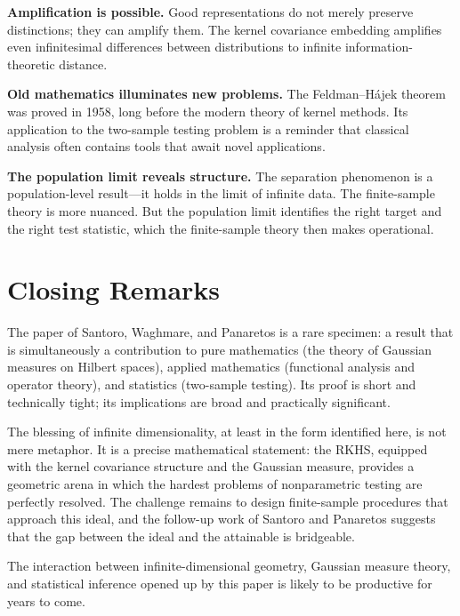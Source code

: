 \documentclass[12pt, oneside]{book}
\theoremstyle{plain}
\theoremstyle{definition}
\begin{document}
\textbf{Amplification is possible.} Good representations do not merely preserve distinctions; they can amplify them. The kernel covariance embedding amplifies even infinitesimal differences between distributions to infinite information-theoretic distance.

\textbf{Old mathematics illuminates new problems.} The Feldman--H\'ajek theorem was proved in 1958, long before the modern theory of kernel methods. Its application to the two-sample testing problem is a reminder that classical analysis often contains tools that await novel applications.

\textbf{The population limit reveals structure.} The separation phenomenon is a population-level result---it holds in the limit of infinite data. The finite-sample theory is more nuanced. But the population limit identifies the right target and the right test statistic, which the finite-sample theory then makes operational.

\section{Closing Remarks}

The paper of Santoro, Waghmare, and Panaretos is a rare specimen: a result that is simultaneously a contribution to pure mathematics (the theory of Gaussian measures on Hilbert spaces), applied mathematics (functional analysis and operator theory), and statistics (two-sample testing). Its proof is short and technically tight; its implications are broad and practically significant.

The blessing of infinite dimensionality, at least in the form identified here, is not mere metaphor. It is a precise mathematical statement: the RKHS, equipped with the kernel covariance structure and the Gaussian measure, provides a geometric arena in which the hardest problems of nonparametric testing are perfectly resolved. The challenge remains to design finite-sample procedures that approach this ideal, and the follow-up work of Santoro and Panaretos suggests that the gap between the ideal and the attainable is bridgeable.

The interaction between infinite-dimensional geometry, Gaussian measure theory, and statistical inference opened up by this paper is likely to be productive for years to come.

\appendix
\end{document}
